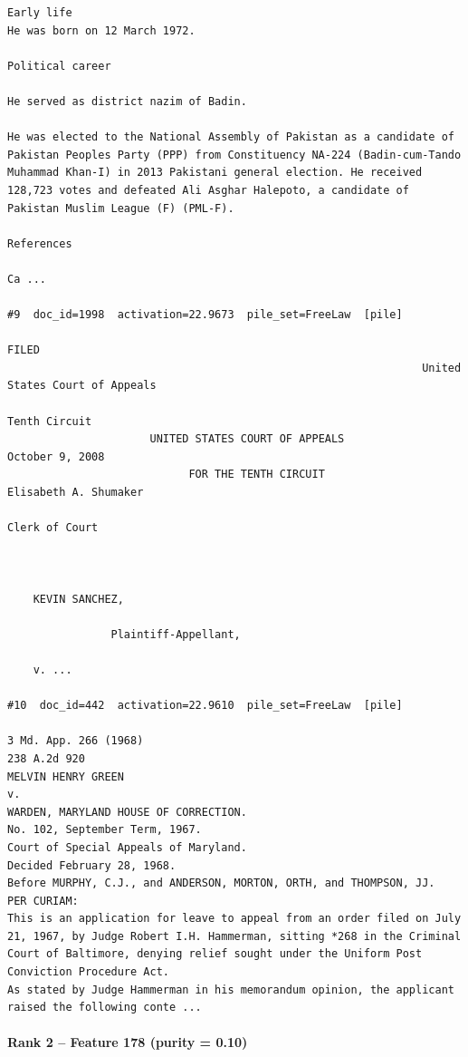 \begin{verbatim}
Early life
He was born on 12 March 1972.

Political career

He served as district nazim of Badin.

He was elected to the National Assembly of Pakistan as a candidate of Pakistan Peoples Party (PPP) from Constituency NA-224 (Badin-cum-Tando Muhammad Khan-I) in 2013 Pakistani general election. He received 128,723 votes and defeated Ali Asghar Halepoto, a candidate of Pakistan Muslim League (F) (PML-F).

References

Ca ...

#9  doc_id=1998  activation=22.9673  pile_set=FreeLaw  [pile]
                                                                            FILED
                                                                United States Court of Appeals
                                                                        Tenth Circuit
                      UNITED STATES COURT OF APPEALS                  October 9, 2008
                            FOR THE TENTH CIRCUIT                   Elisabeth A. Shumaker
                                                                        Clerk of Court



    KEVIN SANCHEZ,

                Plaintiff-Appellant,

    v. ...

#10  doc_id=442  activation=22.9610  pile_set=FreeLaw  [pile]

3 Md. App. 266 (1968)
238 A.2d 920
MELVIN HENRY GREEN
v.
WARDEN, MARYLAND HOUSE OF CORRECTION.
No. 102, September Term, 1967.
Court of Special Appeals of Maryland.
Decided February 28, 1968.
Before MURPHY, C.J., and ANDERSON, MORTON, ORTH, and THOMPSON, JJ.
PER CURIAM:
This is an application for leave to appeal from an order filed on July 21, 1967, by Judge Robert I.H. Hammerman, sitting *268 in the Criminal Court of Baltimore, denying relief sought under the Uniform Post Conviction Procedure Act.
As stated by Judge Hammerman in his memorandum opinion, the applicant raised the following conte ...

\end{verbatim}

\paragraph*{Rank 2 -- Feature 178 (purity = 0.10)}

